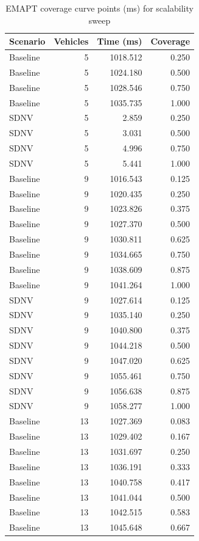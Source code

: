 \begin{table}[t]
\caption{EMAPT coverage curve points (ms) for scalability sweep}
\label{tab:emapt-scale-points}
\centering
\begin{tabular}{lrrr}
\hline
Scenario & Vehicles & Time (ms) & Coverage\\
\hline
Baseline & 5 & 1018.512 & 0.250\\
Baseline & 5 & 1024.180 & 0.500\\
Baseline & 5 & 1028.546 & 0.750\\
Baseline & 5 & 1035.735 & 1.000\\
SDNV & 5 & 2.859 & 0.250\\
SDNV & 5 & 3.031 & 0.500\\
SDNV & 5 & 4.996 & 0.750\\
SDNV & 5 & 5.441 & 1.000\\
Baseline & 9 & 1016.543 & 0.125\\
Baseline & 9 & 1020.435 & 0.250\\
Baseline & 9 & 1023.826 & 0.375\\
Baseline & 9 & 1027.370 & 0.500\\
Baseline & 9 & 1030.811 & 0.625\\
Baseline & 9 & 1034.665 & 0.750\\
Baseline & 9 & 1038.609 & 0.875\\
Baseline & 9 & 1041.264 & 1.000\\
SDNV & 9 & 1027.614 & 0.125\\
SDNV & 9 & 1035.140 & 0.250\\
SDNV & 9 & 1040.800 & 0.375\\
SDNV & 9 & 1044.218 & 0.500\\
SDNV & 9 & 1047.020 & 0.625\\
SDNV & 9 & 1055.461 & 0.750\\
SDNV & 9 & 1056.638 & 0.875\\
SDNV & 9 & 1058.277 & 1.000\\
Baseline & 13 & 1027.369 & 0.083\\
Baseline & 13 & 1029.402 & 0.167\\
Baseline & 13 & 1031.697 & 0.250\\
Baseline & 13 & 1036.191 & 0.333\\
Baseline & 13 & 1040.758 & 0.417\\
Baseline & 13 & 1041.044 & 0.500\\
Baseline & 13 & 1042.515 & 0.583\\
Baseline & 13 & 1045.648 & 0.667\\

\end{tabular}
\end{table}
